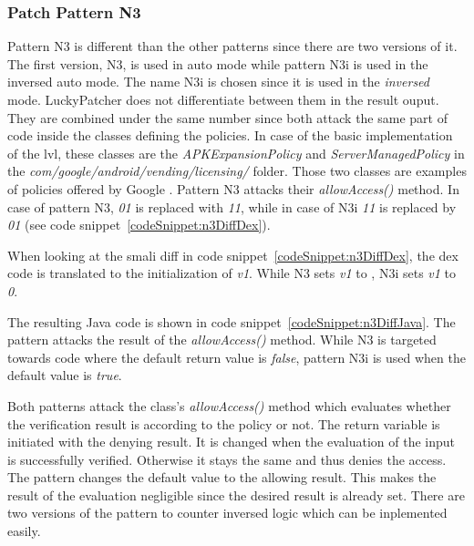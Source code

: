 \subsubsection{Patch Pattern N3}
Pattern N3 is different than the other patterns since there are two versions of it.
The first version, N3, is used in auto mode while pattern N3i is used in the inversed auto mode.
The name N3i is chosen since it is used in the \textit{inversed} mode.
LuckyPatcher does not differentiate between them in the result ouput.
They are combined under the same number since both attack the same part of code inside the classes defining the policies.
In case of the basic implementation of the \gls{lvl}, these classes are the \textit{APKExpansionPolicy} and \textit{ServerManagedPolicy} in the  \textit{com/google/android/vending/licensing/} folder.
Those two classes are examples of policies offered by Google \cite{developersLicensingReference}.
Pattern N3 attacks their \textit{allowAccess()} method.
\newline
In case of pattern N3, \textit{01} is replaced with \textit{11}, while in case of N3i \textit{11} is replaced by \textit{01} (see code snippet~\ref{codeSnippet:n3DiffDex}).
\newline

When looking at the smali diff in code snippet~\ref{codeSnippet:n3DiffDex}, the dex code is translated to the initialization of \textit{v1}.
While N3 sets \textit{v1} to , N3i sets \textit{v1} to \textit{0}.
\newline

The resulting Java code is shown in code snippet~\ref{codeSnippet:n3DiffJava}.
The pattern attacks the result of the \textit{allowAccess()} method.
While N3 is targeted towards code where the default return value is \textit{false}, pattern N3i is used when the default value is \textit{true}.
\newline

Both patterns attack the class's \textit{allowAccess()} method which evaluates whether the verification result is according to the policy or not.
The return variable is initiated with the denying result.
It is changed when the evaluation of the input is successfully verified.
Otherwise it stays the same and thus denies the access.
The pattern changes the default value to the allowing result.
This makes the result of the evaluation negligible since the desired result is already set.
There are two versions of the pattern to counter inversed logic which can be inplemented easily.

